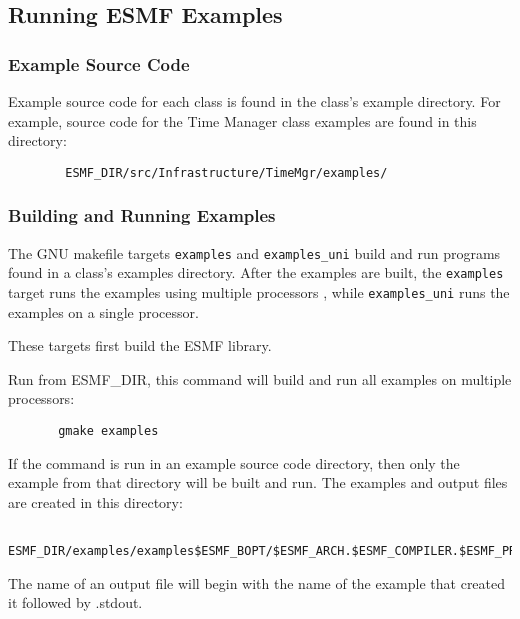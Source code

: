 
\subsection{Running ESMF Examples}
\label{examples}


\subsubsection{Example Source Code}

Example source code for each class is found in the class's example
directory. For example, source code for the Time Manager class examples
are found in this directory:

\begin{verbatim}
        ESMF_DIR/src/Infrastructure/TimeMgr/examples/
\end{verbatim}


\subsubsection{Building and Running Examples}

The GNU makefile targets {\tt examples} and {\tt examples\_uni} build
and run programs found in a class's examples directory.  After the
examples are built, the {\tt examples} target runs the examples using
multiple processors , while {\tt examples\_uni} runs the examples on
a single processor.

These targets first build the ESMF library.

Run from ESMF\_DIR, this command will build and run all examples on
multiple processors:

\begin{verbatim}
       gmake examples
\end{verbatim}

If the command is run in an example source code directory, then only
the example from that directory will be built and run.  The examples
and output files are created in this directory:

\begin{verbatim}
       ESMF_DIR/examples/examples$ESMF_BOPT/$ESMF_ARCH.$ESMF_COMPILER.$ESMF_PREC.$ESMF_SITE/
\end{verbatim}

The name of an output file will begin with the name of the example
that created it followed by .stdout.
